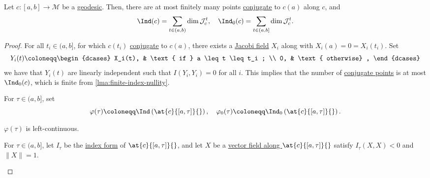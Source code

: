 \begin{theorem}\label{thm:Morse-index}
	Let \(c\colon [a, b] \to \mathcal{M} \) be a \hyperref[def:geodesic]{geodesic}. Then, there are at most finitely many points \hyperref[def:conjugate-point]{conjugate} to \(c(a)\) along \(c\), and
	\[
		\Ind(c) = \sum_{t\in (a, b)} \dim \mathcal{J} _c^t,\quad
		\Ind_0 (c) = \sum_{t\in (a, b]} \dim \mathcal{J} _c^t.
	\]
\end{theorem}
\begin{proof}
	For all \(t_i\in (a, b]\), for which \(c(t_i)\) \hyperref[def:conjugate-point]{conjugate} to \(c(a)\), there exists a \hyperref[def:Jacobi-field]{Jacobi field} \(X_i\) along with \(X_i(a) = 0 = X_i(t_i)\). Set
	\[
		Y_i(t) \coloneqq \begin{dcases}
			X_i(t), & \text{ if } a \leq t \leq t_i ; \\
			0,      & \text{ otherwise} ,
		\end{dcases}
	\]
	we have that \(Y_i(t)\) are linearly independent such that \(I(Y_i, Y_i) = 0\) for all \(i\). This implies that the number of \hyperref[def:conjugate-point]{conjugate points} is at most \(\Ind_0(c) \), which is finite from \autoref{lma:finite-index-nullity}.

	For \(\tau \in (a, b]\), set
	\[
		\varphi (\tau ) \coloneqq \Ind \left( \at{c}{[a, \tau ]}{} \right),\quad
		\varphi _0(\tau ) \coloneqq \Ind_0 \left( \at{c}{[a, \tau ]}{} \right).
	\]
	\begin{claim}
		\(\varphi (\tau )\) is left-continuous.
	\end{claim}
	\begin{explanation}
		For \(\tau \in (a, b]\), let \(I_{\tau } \) be the \hyperref[def:index-form]{index form} of \(\at{c}{[a, \tau ]}{} \), and let \(X\) be a \hyperref[def:vector-field-along-curve]{vector field along \(\at{c}{[a, \tau ]}{} \)} satisfy \(I_{\tau } (X, X) < 0\) and \(\lVert X \rVert = 1\).


\end{explanation}
\end{proof}
